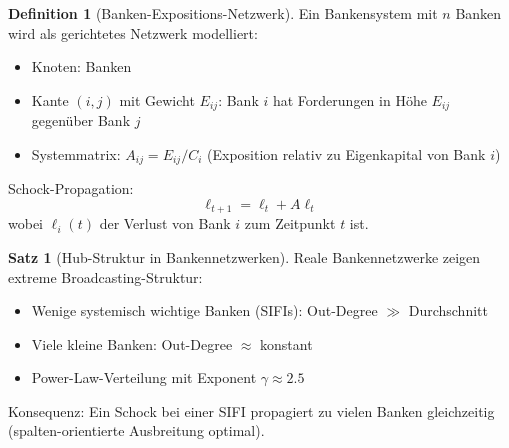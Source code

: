 ﻿\documentclass[a4paper,12pt]{report}
\theoremstyle{definition}
\newtheorem{definition}{Definition}
\newtheorem{satz}{Satz}
\begin{document}
	\begin{definition}[Banken-Expositions-Netzwerk]
		Ein Bankensystem mit $n$ Banken wird als gerichtetes Netzwerk modelliert:
		\begin{itemize}
			\item Knoten: Banken
			\item Kante $(i,j)$ mit Gewicht $E_{ij}$: Bank $i$ hat Forderungen in Höhe $E_{ij}$ gegenüber Bank $j$
			\item Systemmatrix: $A_{ij} = E_{ij} / C_i$ (Exposition relativ zu Eigenkapital von Bank $i$)
		\end{itemize}
		
		Schock-Propagation:
		\[
		\ell_{t+1} = \ell_t + A \ell_t
		\]
		wobei $\ell_i(t)$ der Verlust von Bank $i$ zum Zeitpunkt $t$ ist.
	\end{definition}
	
	\begin{satz}[Hub-Struktur in Bankennetzwerken]
		Reale Bankennetzwerke zeigen extreme Broadcasting-Struktur:
		\begin{itemize}
			\item Wenige systemisch wichtige Banken (SIFIs): Out-Degree $\gg$ Durchschnitt
			\item Viele kleine Banken: Out-Degree $\approx$ konstant
			\item Power-Law-Verteilung mit Exponent $\gamma \approx 2.5$
		\end{itemize}
		
		Konsequenz: Ein Schock bei einer SIFI propagiert zu vielen Banken gleichzeitig (spalten-orientierte Ausbreitung optimal).
	\end{satz}
	
\end{document}
